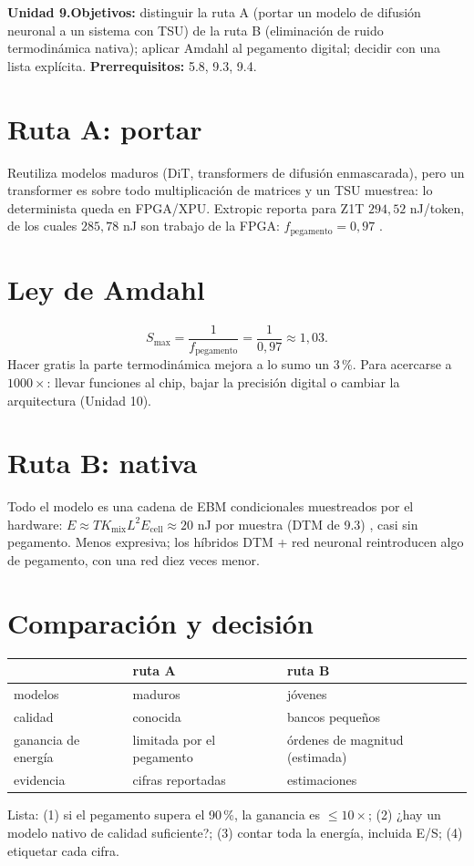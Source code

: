 \documentclass[11pt,a4paper]{article}
\begin{document}

\noindent\textbf{Unidad 9.}\quad\textbf{Objetivos:} distinguir la ruta A (portar un modelo de difusión neuronal a un sistema con TSU) de la ruta B (eliminación de ruido
termodinámica nativa); aplicar Amdahl al pegamento digital; decidir con una lista explícita.
\textbf{Prerrequisitos:} 5.8, 9.3, 9.4.

\section{Ruta A: portar}
Reutiliza modelos maduros (DiT, transformers de difusión enmascarada), pero un transformer es sobre todo multiplicación de matrices y un TSU muestrea: lo determinista queda en
FPGA/XPU. Extropic reporta para Z1T $294{,}52$ nJ/token, de los cuales $285{,}78$ nJ son trabajo de la FPGA: $f_{\text{pegamento}}=0{,}97$ \evP.

\section{Ley de Amdahl}
\[S_{\max}=\frac1{f_{\text{pegamento}}}=\frac1{0{,}97}\approx1{,}03.\]
Hacer gratis la parte termodinámica mejora a lo sumo un 3\,\%. Para acercarse a $1000\times$: llevar funciones al chip, bajar la precisión digital o cambiar la arquitectura (Unidad 10).

\section{Ruta B: nativa}
Todo el modelo es una cadena de EBM condicionales muestreados por el hardware: $E\approx TK_{\text{mix}}L^2E_{\text{cell}}\approx20$ nJ por muestra (DTM de 9.3) \evE, casi sin
pegamento. Menos expresiva; los híbridos DTM + red neuronal reintroducen algo de pegamento, con una red diez veces menor.

\section{Comparación y decisión}
\begin{center}\small\begin{tabular}{lll}\toprule
& ruta A & ruta B\\\midrule
modelos & maduros & jóvenes\\
calidad & conocida & bancos pequeños\\
ganancia de energía & limitada por el pegamento & órdenes de magnitud (estimada)\\
evidencia & cifras reportadas & estimaciones\\\bottomrule\end{tabular}\end{center}
Lista: (1) si el pegamento supera el 90\,\%, la ganancia es $\le10\times$; (2) ¿hay un modelo nativo de calidad suficiente?; (3) contar toda la energía, incluida E/S;
(4) etiquetar cada cifra.
\end{document}
